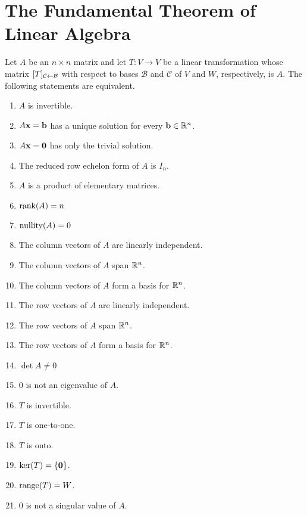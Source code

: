 \documentclass[../m073main.tex]{subfiles}
\begin{document}
\appendix\chapter{The Fundamental Theorem of Linear Algebra}

Let $A$ be an $n\times n$ matrix and let $T : V \to V$ be a linear transformation whose matrix $[T]_{\mathcal{C} \leftarrow \mathcal{B}}$ with respect to bases $\mathcal{B}$ and $\mathcal{C}$ of $V$ and $W$, respectively, is $A$.
The following statements are equivalent.
\begin{enumerate}[label=(\alph*)]
	\item $A$ is invertible.
	\item $A\mathbf{x} = \mathbf{b}$ has a unique solution for every $\mathbf{b} \in \mathbb{R}^n$.
	\item $A\mathbf{x} = \mathbf{0}$ has only the trivial solution.
	\item The reduced row echelon form of $A$ is $I_n$.
	\item $A$ is a product of elementary matrices.
	\item $\operatorname{rank}(A) = n$
	\item $\operatorname{nullity}(A) = 0$
	\item The column vectors of $A$ are linearly independent.
	\item The column vectors of $A$ span $\mathbb{R}^n$.
	\item The column vectors of $A$ form a basis for $\mathbb{R}^n$.
	\item The row vectors of $A$ are linearly independent.
	\item The row vectors of $A$ span $\mathbb{R}^n$.
	\item The row vectors of $A$ form a basis for $\mathbb{R}^n$.
	\item $\det A \neq 0$
	\item 0 is not an eigenvalue of $A$.
	\item $T$ is invertible.
	\item $T$ is one-to-one.
	\item $T$ is onto.
	\item $\operatorname{ker}(T) = \{\mathbf{0}\}$.
	\item $\operatorname{range}(T) = W$.
	\item 0 is not a singular value of $A$.
\end{enumerate}
\end{document}
